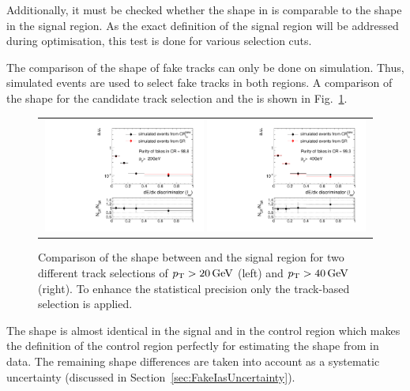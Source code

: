 Additionally, it must be checked whether the \ias shape in \fakeCR is comparable to the \ias shape in the signal region.
As the exact definition of the signal region will be addressed during optimisation, this test is done for various \pt selection cuts.

The comparison of the \ias shape of fake tracks can only be done on simulation.
Thus, simulated \WJets events are used to select fake tracks in both regions.
A comparison of the shape for the candidate track selection and the \fakeCR is shown in Fig.~\ref{fig:IasSRCRFakes}.

\begin{figure}[!t]
  \centering 
  \begin{tabular}{c}
    \includegraphics[width=0.49\textwidth]{figures/analysis/Background/hASmi_fakes_ECalaoLe5_trackPtGt20.pdf}
    \includegraphics[width=0.49\textwidth]{figures/analysis/Background/hASmi_fakes_ECalaoLe5_trackPtGt40.pdf}
  \end{tabular}
  \caption{Comparison of the \ias shape between \fakeCR and the signal region for two different track \pt selections of $p_{\text{T}}>20\,\text{Ge}\kern-0.06667em\text{V}$ (left) and $p_{\text{T}}>40\,\text{Ge}\kern-0.06667em\text{V}$ (right). To enhance the statistical precision only the track-based selection is applied.}
  \label{fig:IasSRCRFakes}
\end{figure}

The \ias shape is almost identical in the signal and in the control region which makes the definition of the control region perfectly for estimating the \ias shape from \fakeCR in data.
The remaining shape differences are taken into account as a systematic uncertainty (discussed in Section~\ref{sec:FakeIasUncertainty}).

